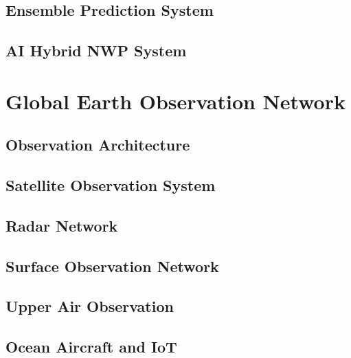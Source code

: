 \documentclass[11pt,a4paper,oneside]{report}
\begin{document}
\chapter{Ensemble Prediction System}



\chapter{AI Hybrid NWP System}



\part{Global Earth Observation Network}


\chapter{Observation Architecture}



\chapter{Satellite Observation System}



\chapter{Radar Network}



\chapter{Surface Observation Network}



\chapter{Upper Air Observation}



\chapter{Ocean Aircraft and IoT}

\end{document}
